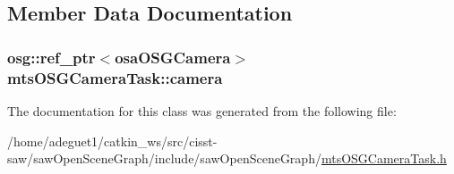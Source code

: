\subsection{Member Data Documentation}
\hypertarget{classmts_o_s_g_camera_task_acdbb6886bc066f06c2fb26be44b60534}{
\subsubsection[{camera}]{\setlength{\rightskip}{0pt plus 5cm}osg\-::ref\-\_\-ptr$<${\bf osa\-O\-S\-G\-Camera}$>$ mts\-O\-S\-G\-Camera\-Task\-::camera\hspace{0.3cm}{\ttfamily [protected]}}}\label{classmts_o_s_g_camera_task_acdbb6886bc066f06c2fb26be44b60534}


The documentation for this class was generated from the following file\-:\begin{DoxyCompactItemize}
\item 
/home/adeguet1/catkin\-\_\-ws/src/cisst-\/saw/saw\-Open\-Scene\-Graph/include/saw\-Open\-Scene\-Graph/\hyperlink{mts_o_s_g_camera_task_8h}{mts\-O\-S\-G\-Camera\-Task.\-h}\end{DoxyCompactItemize}
